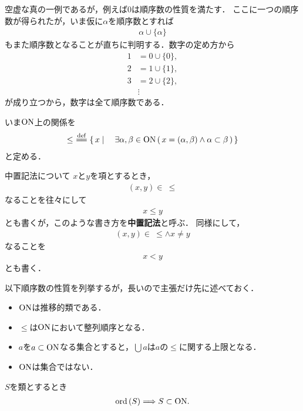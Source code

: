 	空虚な真の一例であるが，例えば$0$は順序数の性質を満たす．
	ここに一つの順序数が得られたが，いま仮に$\alpha$を順序数とすれば
	\begin{align}
		\alpha \cup \{\alpha\}
	\end{align}
	もまた順序数となることが直ちに判明する．数字の定め方から
	\begin{align}
		1 &= 0 \cup \{0\}, \\
		2 &= 1 \cup \{1\}, \\
		3 &= 2 \cup \{2\}, \\
		&\vdots
	\end{align}
	が成り立つから，数字は全て順序数である．
	
	いま$\mathrm{ON}$上の関係を
	\begin{align}
		\leq\ \defeq \Set{x}{\exists \alpha,\beta \in \ON\, 
		(\, x=(\alpha,\beta) \wedge \alpha \subset \beta\, )}
	\end{align}
	と定める．
		
	\begin{itembox}[l]{中置記法について}
		$x$と$y$を項とするとき，
		\begin{align}
			(x,y) \in\ \leq
		\end{align}
		なることを往々にして
		\begin{align}
			x \leq y
		\end{align}
		とも書くが，このような書き方を{\bf 中置記法}と呼ぶ．
		同様にして，
		\begin{align}
			(x,y) \in\ \leq \wedge x \neq y
		\end{align}
		なることを
		\begin{align}
			x < y
		\end{align}
		とも書く．
	\end{itembox}
	
	以下順序数の性質を列挙するが，長いので主張だけ先に述べておく．
	\begin{itemize}
		\item $\mathrm{ON}$は推移的類である．
		\item $\leq$は$\mathrm{ON}$において整列順序となる．
		\item $a$を$a \subset \mathrm{ON}$なる集合とすると，$\bigcup a$は$a$の$\leq$に関する上限となる．
		\item $\mathrm{ON}$は集合ではない．
	\end{itemize}
	
	\begin{screen}
		\begin{thm}
		\label{thm:transitive_totally_ordered_class_is_contained_in_ON}
			$S$を類とするとき
			\begin{align}
				\operatorname*{ord} \left(S\right) \Longrightarrow S \subset \mathrm{ON}.
			\end{align}
		\end{thm}
	\end{screen}
	
